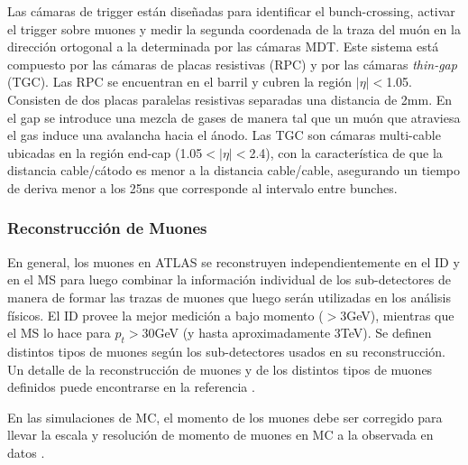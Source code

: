 Las cámaras de trigger están diseñadas para identificar el bunch-crossing, activar el trigger sobre muones y medir la segunda coordenada de la traza del muón en la dirección ortogonal a la determinada por las cámaras MDT. Este sistema está compuesto por las cámaras de placas resistivas (RPC) y por las cámaras \textit{thin-gap} (TGC). Las RPC se encuentran en el barril y cubren la región $|\eta|<$1.05. Consisten de dos placas paralelas resistivas separadas una distancia de 2mm. En el gap se introduce una mezcla de gases de manera tal que un muón que atraviesa el gas induce una avalancha hacia el ánodo. Las TGC son cámaras multi-cable ubicadas en la región end-cap (1.05$<|\eta|<$2.4), con la característica de que la distancia cable/cátodo es menor a la distancia cable/cable, asegurando un tiempo de deriva menor a los 25ns que corresponde al intervalo entre bunches. 

\subsubsection{Reconstrucción de Muones}\label{Muones}

En general, los muones en ATLAS se reconstruyen independientemente en el ID y en el MS para luego combinar la información individual de los sub-detectores de manera de formar las trazas de muones que luego serán utilizadas en los análisis físicos. El ID provee la mejor medición a bajo momento ($>$3GeV), mientras que el MS lo hace para $p_t>$30GeV (y hasta aproximadamente 3TeV). Se definen distintos tipos de muones según los sub-detectores usados en su reconstrucción. Un detalle de la reconstrucción de muones y de los distintos tipos de muones definidos puede encontrarse en la referencia \cite{MuonReco}.

En las simulaciones de MC, el momento de los muones debe ser corregido para llevar la escala y resolución de momento de muones en MC a la observada en datos \cite{MuonCalib}.  

